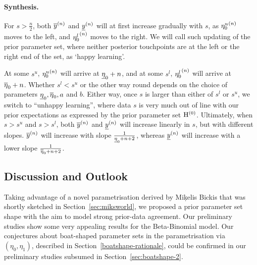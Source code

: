 

\paragraph{Synthesis.}

For $s > \frac{n}{2}$, both $\overline{y}^{(n)}$ and $\underline{y}^{(n)}$ will at first increase gradually with $s$,
as ${\eta_0^u}^{(n)}$ moves to the left, and ${\eta_0^l}^{(n)}$ moves to the right.
We will call such updating of the prior parameter set,
where neither posterior touchpoints are at the left or the right end of the set, as `happy learning'.

At some $s^u$, ${\eta_0^u}^{(n)}$ will arrive at $\underline{\eta}_0 + n$,
and at some $s^l$, ${\eta_0^l}^{(n)}$ will arrive at $\overline{\eta}_0 + n$.
Whether $s^l < s^u$ or the other way round depends on
the choice of parameters $\underline{\eta}_0, \overline{\eta}_0, a$ and $b$.
Either way, once $s$ is larger than either of $s^l$ or $s^u$,
we switch to ``unhappy learning'',
where data $s$ is very much out of line with our prior expectations as expressed
by the prior parameter set $\mathrm{H}^{(0)}$.
Ultimately, when $s > s^u$ and $s > s^l$,
both $\overline{y}^{(n)}$ and $\underline{y}^{(n)}$ will increase linearly in $s$, but with different slopes.
$\overline{y}^{(n)}$ will increase with slope $\frac{1}{\underline{\eta}_0 + n + 2}$,
whereas $\underline{y}^{(n)}$ will increase with a lower slope $\frac{1}{\overline{\eta}_0 + n + 2}$.


\subsection{Discussion and Outlook}
\label{sec:boatshape-outlook}

Taking advantage of a novel parametrisation derived by Mi\c{k}elis Bickis that was shortly sketched in Section~\ref{sec:miksworld},
we proposed a prior parameter set shape with the aim to model strong prior-data agreement.
Our preliminary studies show some very appealing results for the Beta-Binomial model.
Our conjectures about boat-shaped parameter sets in the parametrisation via $(\eta_0,\eta_1)$,
described in Section~\ref{boatshape-rationale},
could be confirmed in our preliminary studies subsumed in Section~\ref{sec:boatshape-2}.

